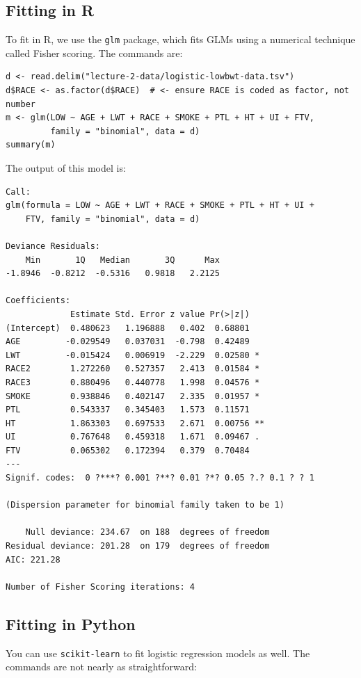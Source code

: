 \subsection*{Fitting in R}

To fit in R, we use the \texttt{glm} package, which fits GLMs using a numerical technique called Fisher scoring. The commands are:

{\small
\begin{verbatim}
d <- read.delim("lecture-2-data/logistic-lowbwt-data.tsv")
d$RACE <- as.factor(d$RACE)  # <- ensure RACE is coded as factor, not number
m <- glm(LOW ~ AGE + LWT + RACE + SMOKE + PTL + HT + UI + FTV, 
         family = "binomial", data = d)
summary(m)
\end{verbatim} 

\noindent The output of this model is:

\begin{verbatim}
Call:
glm(formula = LOW ~ AGE + LWT + RACE + SMOKE + PTL + HT + UI + 
    FTV, family = "binomial", data = d)

Deviance Residuals: 
    Min       1Q   Median       3Q      Max  
-1.8946  -0.8212  -0.5316   0.9818   2.2125  

Coefficients:
             Estimate Std. Error z value Pr(>|z|)   
(Intercept)  0.480623   1.196888   0.402  0.68801   
AGE         -0.029549   0.037031  -0.798  0.42489   
LWT         -0.015424   0.006919  -2.229  0.02580 * 
RACE2        1.272260   0.527357   2.413  0.01584 * 
RACE3        0.880496   0.440778   1.998  0.04576 * 
SMOKE        0.938846   0.402147   2.335  0.01957 * 
PTL          0.543337   0.345403   1.573  0.11571   
HT           1.863303   0.697533   2.671  0.00756 **
UI           0.767648   0.459318   1.671  0.09467 . 
FTV          0.065302   0.172394   0.379  0.70484   
---
Signif. codes:  0 ?***? 0.001 ?**? 0.01 ?*? 0.05 ?.? 0.1 ? ? 1

(Dispersion parameter for binomial family taken to be 1)

    Null deviance: 234.67  on 188  degrees of freedom
Residual deviance: 201.28  on 179  degrees of freedom
AIC: 221.28

Number of Fisher Scoring iterations: 4
\end{verbatim}
}

\subsection*{Fitting in Python}

You can use \texttt{scikit-learn} to fit logistic regression models as well. The commands are not nearly as straightforward:

